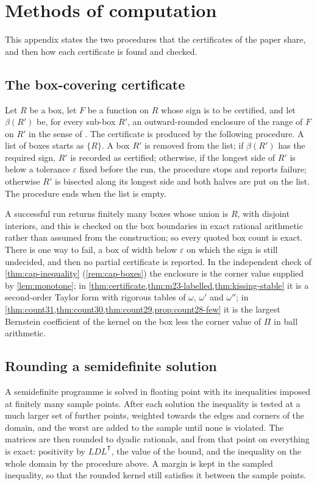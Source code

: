 \documentclass[11pt,reqno]{amsart}
\renewcommand{\_}{\origunderscore\allowbreak}
\numberwithin{equation}{section}
\theoremstyle{plain}
\theoremstyle{definition}
\theoremstyle{remark}
\begin{document}
\section{Methods of computation}\label{app:code-index}

This appendix states the two procedures that the certificates of the paper
share, and then how each certificate is found and checked.

\subsection*{The box-covering certificate}\label{app:box-cover-algo}

Let $R$ be a box, let $F$ be a function on $R$ whose sign is to be
certified, and let $\beta(R')$ be, for every sub-box $R'$, an
outward-rounded enclosure of the range of $F$ on $R'$ in the sense of
\cite[Ch.~5]{MKC09}. The certificate is produced by the following
procedure. A list of boxes starts as $\{R\}$. A box $R'$ is removed from
the list; if $\beta(R')$ has the required sign, $R'$ is recorded as
certified; otherwise, if the longest side of $R'$ is below a tolerance
$\varepsilon$ fixed before the run, the procedure stops and reports
failure; otherwise $R'$ is bisected along its longest side and both halves
are put on the list. The procedure ends when the list is empty.

A successful run returns finitely many boxes whose union is $R$, with
disjoint interiors, and this is checked on the box boundaries in exact
rational arithmetic rather than assumed from the construction; so every
quoted box count is exact. There is one way to fail, a box of width below
$\varepsilon$ on which the sign is still undecided, and then no partial
certificate is reported. In the independent check of \cref{thm:cap-inequality}
(\cref{rem:cap-boxes}) the enclosure is the corner value supplied by
\cref{lem:monotone}; in
\cref{thm:certificate,thm:m23-labelled,thm:kissing-stable} it is a
second-order Taylor form with rigorous tables of $\omega$, $\omega'$ and
$\omega''$; in \cref{thm:count31,thm:count30,thm:count29,prop:count28-few} it is the largest Bernstein
coefficient \cite{Far12} of the kernel on the box less the corner value of
$\Pi$ in ball arithmetic.

\subsection*{Rounding a semidefinite solution}

A semidefinite programme is solved in floating point with its inequalities
imposed at finitely many sample points. After each solution the inequality
is tested at a much larger set of further points, weighted towards the
edges and corners of the domain, and the worst are added to the sample
until none is violated. The matrices are then rounded to dyadic rationals,
and from that point on everything is exact: positivity by $LDL^{\mathsf T}$,
the value of the bound, and the inequality on the whole domain by the
procedure above. A margin is kept in the sampled inequality, so that the
rounded kernel still satisfies it between the sample points.
\end{document}
